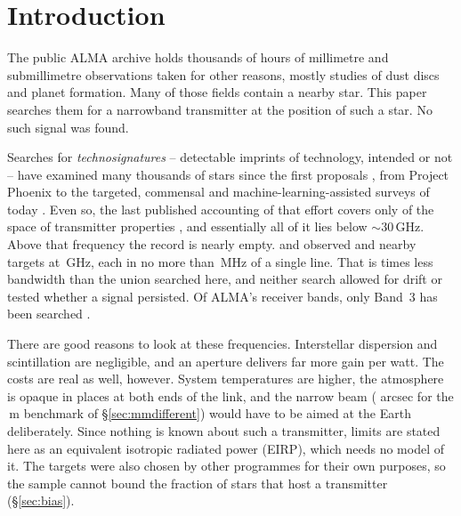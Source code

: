 \section{Introduction}
\label{sec:intro}

The public ALMA archive holds thousands of hours of millimetre and
submillimetre observations taken for other reasons, mostly studies of dust
discs and planet formation. Many of those fields contain a nearby star.
This
paper searches them for a narrowband transmitter at the position of such a
star. No such signal was found.

Searches for \emph{technosignatures} -- detectable imprints of technology,
intended or not \citep{Sheikh2020,SETIreview2025} -- have examined many
thousands of stars since the first proposals
\citep{CocconiMorrison1959,Drake1960}, from Project Phoenix
\citep{Tarter2001,Backus2002} to the targeted, commensal and
machine-learning-assisted surveys of today
\citep{Zhang2020,Czech2021,FAST3IATLAS2025,LOFARdualsite2023,Choza2024,Morrison2023,Tremblay2024,SRT2025,Ma2023,GLOBULAR2025,AnomalyParkesGBT2025}.
Even so, the last published accounting of that effort covers only
\HaystackFrac{} of the space of transmitter properties \citep{Wright2018},
and essentially all of it lies below ${\sim}30$\,GHz. Above that frequency
the record is nearly empty. \citet{Steffes1994} and \citet{Mauersberger1996}
observed \SbPriorNStarA{} and \SbPriorNStarB{} nearby targets at
\SbPriorFreqGHz\,GHz, each in no more than \SbPriorBandMHz\,MHz of a single
line. That is \SbPriorRatio{} times less bandwidth than the union searched
here, and neither search allowed for drift or tested whether a signal
persisted. Of ALMA's receiver bands, only Band~3 has been searched
\citep{Mason2025}.

There are good reasons to look at these frequencies. Interstellar dispersion
and scintillation are negligible, and an aperture delivers far more gain per
watt. The costs are real as well, however. System temperatures are higher,
the atmosphere is opaque in places at both ends of the link, and the narrow
beam (\BmArcsec{} arcsec for the \BenchDiam\,m benchmark of
\S\ref{sec:mmdifferent}) would have to be aimed at the Earth deliberately.
Since nothing is known about such a transmitter, limits are stated here as
an equivalent isotropic radiated power (EIRP), which needs no model of it.
The targets were also chosen by other programmes for their own purposes, so
the sample cannot bound the fraction of stars that host a transmitter
\citep{Wright2018,Margot2023,EarthDetectingEarth2025} (\S\ref{sec:bias}).

